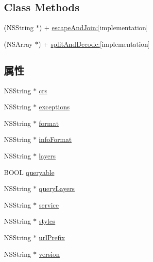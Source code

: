 \subsection*{Class Methods}
\begin{DoxyCompactItemize}
\item 
(N\-S\-String $\ast$) + \hyperlink{interface_r_m_w_m_s_a48aeac87d868f8d4bbf6e932865affcd}{escape\-And\-Join\-:}{\ttfamily  \mbox{[}implementation\mbox{]}}
\item 
(N\-S\-Array $\ast$) + \hyperlink{interface_r_m_w_m_s_a2e66d5e69a10f9ed481d40efbc4af4dd}{split\-And\-Decode\-:}{\ttfamily  \mbox{[}implementation\mbox{]}}
\end{DoxyCompactItemize}
\subsection*{属性}
\begin{DoxyCompactItemize}
\item 
N\-S\-String $\ast$ \hyperlink{interface_r_m_w_m_s_a5de5fd2cc45d3d5619240b5002c57780}{crs}
\item 
N\-S\-String $\ast$ \hyperlink{interface_r_m_w_m_s_aa64c9b69921dd1b5f81e81d3c779c9c3}{exceptions}
\item 
N\-S\-String $\ast$ \hyperlink{interface_r_m_w_m_s_a27cb6fed7d8d9a4f1b97f0ca7ae6a9cc}{format}
\item 
N\-S\-String $\ast$ \hyperlink{interface_r_m_w_m_s_ac0a197d34cda3319ff17b255c8ee38a6}{info\-Format}
\item 
N\-S\-String $\ast$ \hyperlink{interface_r_m_w_m_s_a88c4bda246e3feec64d6e681b898661f}{layers}
\item 
B\-O\-O\-L \hyperlink{interface_r_m_w_m_s_a9d9d90f2e13769ae4537cf3fff0cd7e1}{queryable}
\item 
N\-S\-String $\ast$ \hyperlink{interface_r_m_w_m_s_a8a7e94a3ace47cea143e8e08f9478e24}{query\-Layers}
\item 
N\-S\-String $\ast$ \hyperlink{interface_r_m_w_m_s_a2711101eab3713f9ef5451d27233a593}{service}
\item 
N\-S\-String $\ast$ \hyperlink{interface_r_m_w_m_s_a3264490c624524b19560996f05aeef3e}{styles}
\item 
N\-S\-String $\ast$ \hyperlink{interface_r_m_w_m_s_aa7a542039274aa78ee1b186f56b45aa9}{url\-Prefix}
\item 
N\-S\-String $\ast$ \hyperlink{interface_r_m_w_m_s_a068c53621b6a7872617d660dcdd6a260}{version}
\end{DoxyCompactItemize}


